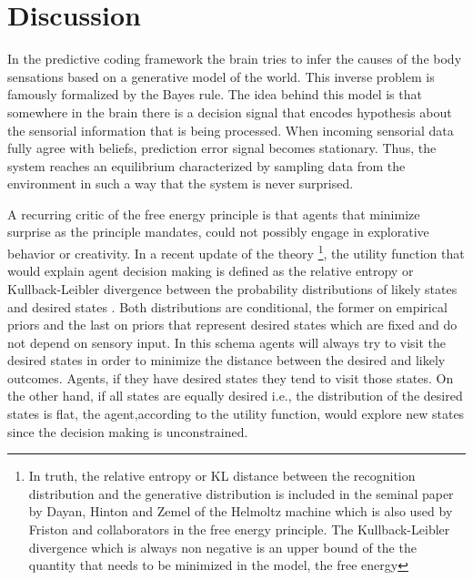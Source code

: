 \documentclass[11pt, onecolumn]{article}
\begin{document}
\section{Discussion}
\label{se:dis}

In the predictive coding framework the brain tries to infer the causes of the body sensations based on a generative model of the world. This inverse problem is famously formalized by the Bayes rule. The idea behind this model is that somewhere in the brain there is a decision signal that encodes hypothesis about the sensorial information that is being processed. When incoming sensorial data fully agree with beliefs, prediction error signal becomes stationary. Thus, the system reaches an equilibrium characterized by sampling data from the environment in such a way that the system is never surprised.   

A recurring critic of the free energy principle is that agents that minimize surprise as the principle mandates, could not possibly engage in explorative  behavior or creativity. In a recent update of the theory \footnote{In truth, the relative entropy or KL distance between the recognition distribution and the generative distribution is included in the seminal paper by Dayan, Hinton and Zemel of the Helmoltz machine \citep{dayan_helmholtz_1995} which is also used by Friston and collaborators in the free energy principle. The Kullback-Leibler divergence which is always non negative is an upper
bound of the the quantity that needs to be minimized in the model, the free energy}, the utility function that would explain agent decision making is defined as the relative entropy or Kullback-Leibler divergence between the probability distributions of likely states and desired states \citep{schwartenbeck_exploration_2013}. Both distributions are conditional, the former on empirical priors and the last on priors that represent desired states which are fixed and do not depend on sensory input. In this schema agents will always try to visit the desired states in order to minimize the distance between the desired and likely outcomes. Agents, if they have desired states they tend to visit those states. On the other hand, if all states are equally desired i.e., the distribution of the desired states is flat, the agent,according to the utility function, would explore new states since the decision making is unconstrained.
\end{document}
